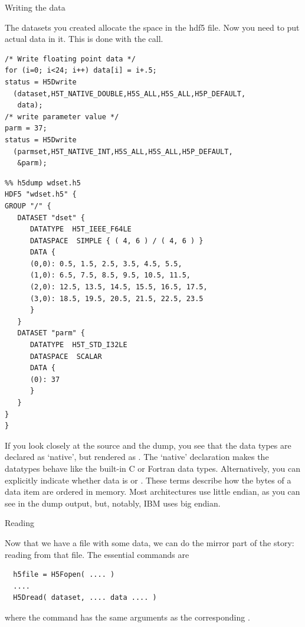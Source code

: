  {Writing the data}

The datasets you created allocate the space in the hdf5 file. Now you
need to put actual data in it. This is done with the  call.

{\small
\begin{verbatim}
/* Write floating point data */
for (i=0; i<24; i++) data[i] = i+.5;
status = H5Dwrite
  (dataset,H5T_NATIVE_DOUBLE,H5S_ALL,H5S_ALL,H5P_DEFAULT,
   data); 
/* write parameter value */
parm = 37;
status = H5Dwrite
  (parmset,H5T_NATIVE_INT,H5S_ALL,H5S_ALL,H5P_DEFAULT,
   &parm);
\end{verbatim}


\begin{verbatim}
%% h5dump wdset.h5     
HDF5 "wdset.h5" {
GROUP "/" {
   DATASET "dset" {
      DATATYPE  H5T_IEEE_F64LE
      DATASPACE  SIMPLE { ( 4, 6 ) / ( 4, 6 ) }
      DATA {
      (0,0): 0.5, 1.5, 2.5, 3.5, 4.5, 5.5,
      (1,0): 6.5, 7.5, 8.5, 9.5, 10.5, 11.5,
      (2,0): 12.5, 13.5, 14.5, 15.5, 16.5, 17.5,
      (3,0): 18.5, 19.5, 20.5, 21.5, 22.5, 23.5
      }
   }
   DATASET "parm" {
      DATATYPE  H5T_STD_I32LE
      DATASPACE  SCALAR
      DATA {
      (0): 37
      }
   }
}
}
\end{verbatim}
}

If you look closely at the source and the dump, you see that the data
types are declared as `native', but rendered as .  The `native'
declaration makes the datatypes behave like the built-in C or Fortran
data types. Alternatively, you can explicitly indicate whether data is
 or . These terms
describe how the bytes of a data item are ordered in memory. Most
architectures use little endian, as you can see in the dump output,
but, notably, IBM uses big endian.

 {Reading}

Now that we have a file with some data, we can do the mirror part of
the story: reading from that file. The essential commands are
\begin{verbatim}
  h5file = H5Fopen( .... )
  ....
  H5Dread( dataset, .... data .... )
\end{verbatim}
where the  command has the same arguments as the
corresponding .


